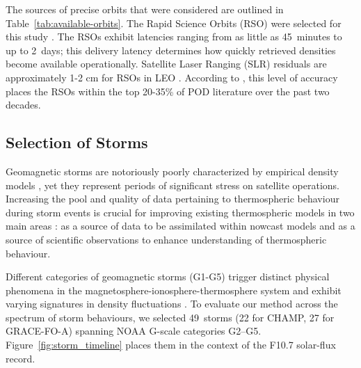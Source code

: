 \documentclass{agujournal2019}
\begin{document}

The sources of precise orbits that were considered are outlined in Table~\ref{tab:available-orbits}. The Rapid Science Orbits (RSO) were selected for this study \cite{Schreiner2022GFZProducts}. The RSOs exhibit latencies ranging from as little as 45~minutes to up to 2~days; this delivery latency determines how quickly retrieved densities become available operationally. Satellite Laser Ranging (SLR) residuals are approximately 1-2 cm for RSOs in LEO \cite{Schreiner2022GFZProducts}. According to , this level of accuracy places the RSOs within the top 20-35\% of POD literature over the past two decades.

\subsection{Selection of Storms}
Geomagnetic storms are notoriously poorly characterized by empirical density models 
\cite{Oliveira2021TheStorms, Oliveira2017ThermosphereEjections, Mutschler2023AOperations}, yet they represent periods of significant stress on satellite operations. Increasing the pool and quality of data pertaining to thermospheric behaviour during storm events is crucial for improving existing thermospheric models in two main areas \cite{Fang2022Space2022, Berger2023TheOperations}: as a source of data to be assimilated within nowcast models and as a source of scientific observations to enhance understanding of thermospheric behaviour.

Different categories of geomagnetic storms (G1-G5) \cite{NOAASWPC2024NOAAScales} trigger distinct physical phenomena in the magnetosphere-ionosphere-thermosphere system and exhibit varying signatures in density fluctuations
\cite{Knipp2021TimelinesStorms, Astafyeva2017GlobalModeling, Laskar2023ThermosphericStorm, Oliveira2017ThermosphereEjections}. To evaluate our method across the spectrum of storm behaviours, we selected 49~storms (22 for CHAMP, 27 for GRACE-FO-A) spanning NOAA G-scale categories G2--G5. Figure~\ref{fig:storm_timeline} places them in the context of the F10.7 solar-flux record.
\end{document}
